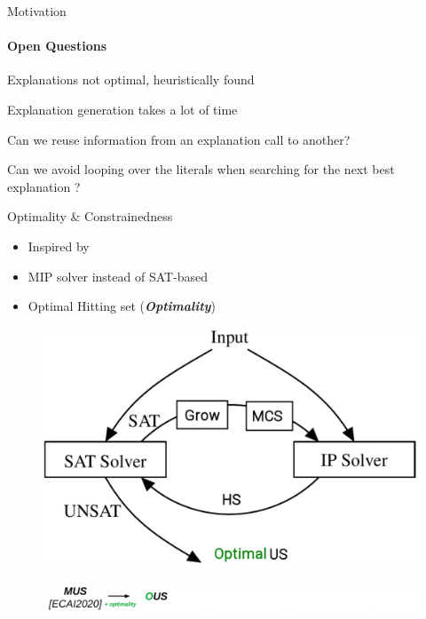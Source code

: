\documentclass{beamer}
\begin{document}
\begin{frame}{Motivation}
	\framesubtitle{Open Questions}

   \begin{description}[font=\color{vuborange}\itshape]
	\item[\hspace{0.9cm}Optimality] Explanations not optimal, heuristically found \pause
	\item[\hspace{1.05cm}Efficiency] Explanation generation takes a lot of time \pause
	\item[\hspace{0.3cm}Incrementality] Can we reuse information from an explanation call to another? \pause
	\item[Constrainedness] Can we avoid looping over the literals when searching for the next best explanation ?
   \end{description}
\end{frame}

\begin{frame}{Optimality \& Constrainedness}
	\begin{minipage}{0.49\textwidth}
		\begin{itemize}
			\item Inspired by \cite{ignatiev2015smallest}
			\item MIP solver instead of SAT-based
			\item Optimal Hitting set (\emph{\textbf{Optimality}})
		\end{itemize}\pause

	\end{minipage}
	\begin{minipage}{0.5\textwidth}
	\begin{figure}
		\includegraphics[width=\textwidth]{ihs.png}
\end{figure}
\end{minipage}
\vfill
	\begin{figure}
	\includegraphics[width=\textwidth]{mus_to_ous.png}
\end{figure}

\end{frame}
\end{document}

